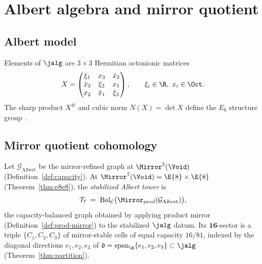 \appendix
\section{Albert algebra and mirror quotient}
\label{sec:appendix}

\subsection{Albert model}
\label{sec:appendix:albert}

Elements of $\jalg$ are $3\times3$ Hermitian octonionic matrices
\begin{equation}\label{eq:matrix}
  X=\begin{pmatrix}
    \xi_1 & x_3 & \bar x_2\\
    \bar x_3 & \xi_2 & x_1\\
    x_2 & \bar x_1 & \xi_3
  \end{pmatrix},
  \qquad \xi_i\in\R,\ x_i\in\Oct.
\end{equation}
The sharp product $X^{\#}$ and cubic norm $N(X)=\det X$ define the $E_6$
structure group~\cite{SpringerVeldkamp2000,Jacobson1968}.

\subsection{Mirror quotient cohomology}
\label{sec:appendix:quotient}

\begin{definition}\label{def:tower7}
Let $\mathcal{G}_{\mathrm{Albert}}$ be the mirror-refined graph at
$\Mirror^5(\Void)$ (Definition~\ref{def:capacity}). At
$\Mirror^7(\Void)=\E{8}\times\E{8}$ (Theorem~\ref{thm:e8e8}), the
\emph{stabilized Albert tower} is
\begin{equation}\label{eq:tower7}
  \mathcal{T}_7
  \;=\;
  \mathrm{Bal}_{\mathcal{C}}\bigl(\Mirror_{\mathrm{prod}}(\mathcal{G}_{\mathrm{Albert}})\bigr),
\end{equation}
the capacity-balanced graph obtained by applying product mirror
(Definition~\ref{def:prod-mirror}) to the stabilized $\jalg$ datum. Its
$\mathbf{16}$-sector is a triple $\{C_1,C_2,C_3\}$ of mirror-stable cells of
equal capacity $16/81$, indexed by the diagonal directions
$e_1,e_2,e_3$ of $\mathfrak{d}=\mathrm{span}_\R\{e_1,e_2,e_3\}\subset\jalg$
(Theorem~\ref{thm:partition}).
\end{definition}

